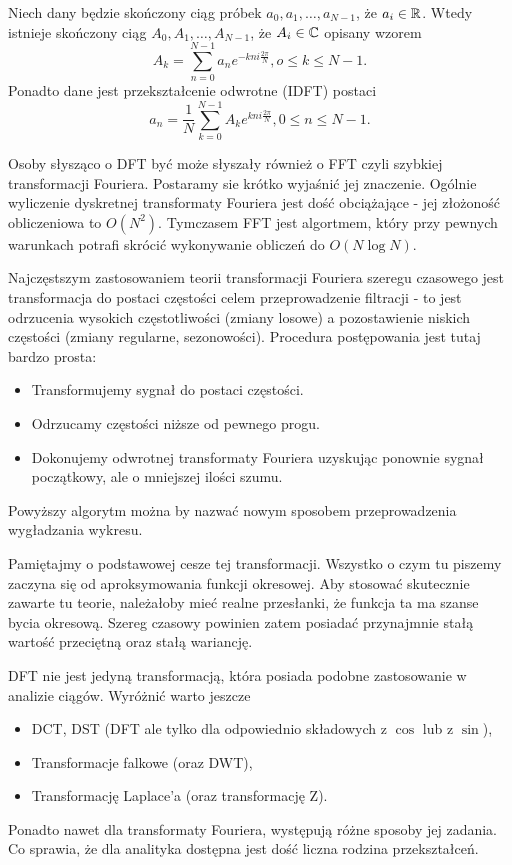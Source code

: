 \documentclass[10pt,a4paper]{book}
\begin{document}
\begin{definition}[DFT]
Niech dany będzie skończony ciąg próbek $a_0, a_1, \ldots, a_{N-1}$, że $a_i \in \mathbb{R} $. Wtedy istnieje skończony ciąg $A_0, A_1, \ldots, A_{N-1}$, że $A_i \in \mathbb{C} $ opisany wzorem
$$
A_k = \sum_{n=0}^{N-1} a_n e^{-kn i \frac{2\pi}{N}}, o \leq k \leq N-1.
$$
Ponadto dane jest przekształcenie odwrotne (IDFT) postaci
$$
a_n = \frac{1}{N} \sum_{k=0}^{N-1} A_k e^{kn i \frac{2\pi}{N}}, 0 \leq n \leq N-1.
$$
\end{definition}

Osoby słysząco o DFT być może słyszały również o FFT czyli szybkiej transformacji Fouriera. Postaramy sie krótko wyjaśnić jej znaczenie. Ogólnie wyliczenie dyskretnej transformaty Fouriera jest dość obciążające - jej złożoność obliczeniowa to $O(N^2)$. Tymczasem FFT jest algortmem, który przy pewnych warunkach potrafi skrócić wykonywanie obliczeń do $O(N \log N)$.

Najczęstszym zastosowaniem teorii transformacji Fouriera szeregu czasowego jest transformacja do postaci częstości celem przeprowadzenie filtracji - to jest odrzucenia wysokich częstotliwości (zmiany losowe) a pozostawienie niskich częstości (zmiany regularne, sezonowości). Procedura postępowania jest tutaj bardzo prosta:

\begin{itemize}
\item Transformujemy sygnał do postaci częstości.
\item Odrzucamy częstości niższe od pewnego progu.
\item Dokonujemy odwrotnej transformaty Fouriera uzyskując ponownie sygnał początkowy, ale o mniejszej ilości szumu.
\end{itemize}

Powyższy algorytm można by nazwać nowym sposobem przeprowadzenia wygładzania wykresu.

\begin{remark*}
Pamiętajmy o podstawowej cesze tej transformacji. Wszystko o czym tu piszemy zaczyna się od aproksymowania funkcji okresowej. Aby stosować skutecznie zawarte tu teorie, należałoby mieć realne przesłanki, że funkcja ta ma szanse bycia okresową. Szereg czasowy powinien zatem posiadać przynajmnie stałą wartość przeciętną oraz stałą wariancję.
\end{remark*} 

\begin{remark*}
DFT nie jest jedyną transformacją, która posiada podobne zastosowanie w analizie ciągów. Wyróżnić warto jeszcze
\begin{itemize}
\item DCT, DST (DFT ale tylko dla odpowiednio składowych z $\cos$ lub z $\sin$),
\item Transformacje falkowe (oraz DWT),
\item Transformację Laplace'a (oraz transformację Z).
\end{itemize}
Ponadto nawet dla transformaty Fouriera, występują różne sposoby jej zadania. Co sprawia, że dla analityka dostępna jest dość liczna rodzina przekształceń.
\end{remark*}
\end{document}

